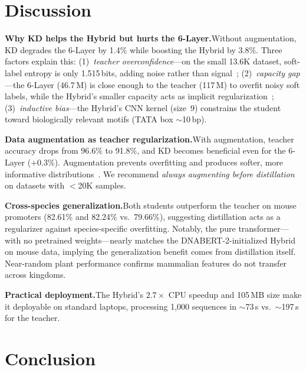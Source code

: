 \documentclass{article}
\begin{document}
\section{Discussion}
\label{sec:discussion}

\textbf{Why KD helps the Hybrid but hurts the 6-Layer.}\quad Without augmentation, KD degrades the 6-Layer by 1.4\% while boosting the Hybrid by 3.8\%. Three factors explain this: (1)~\emph{teacher overconfidence}---on the small 13.6K dataset, soft-label entropy is only 1.515\,bits, adding noise rather than signal~\cite{hinton2015distilling, li2023curriculum}; (2)~\emph{capacity gap}---the 6-Layer (46.7\,M) is close enough to the teacher (117\,M) to overfit noisy soft labels, while the Hybrid's smaller capacity acts as implicit regularization~\cite{mirzadeh2020improved}; (3)~\emph{inductive bias}---the Hybrid's CNN kernel (size~9) constrains the student toward biologically relevant motifs (TATA box $\sim$10\,bp).

\textbf{Data augmentation as teacher regularization.}\quad With augmentation, teacher accuracy drops from 96.6\% to 91.8\%, and KD becomes beneficial even for the 6-Layer ($+0.3\%$). Augmentation prevents overfitting and produces softer, more informative distributions~\cite{tang2020understanding}. We recommend \emph{always augmenting before distillation} on datasets with $<$20K samples.

\textbf{Cross-species generalization.}\quad Both students outperform the teacher on mouse promoters (82.61\% and 82.24\% vs.\ 79.66\%), suggesting distillation acts as a regularizer against species-specific overfitting. Notably, the pure transformer---with no pretrained weights---nearly matches the DNABERT-2-initialized Hybrid on mouse data, implying the generalization benefit comes from distillation itself. Near-random plant performance confirms mammalian features do not transfer across kingdoms.

\textbf{Practical deployment.}\quad The Hybrid's $2.7\times$ CPU speedup and 105\,MB size make it deployable on standard laptops, processing 1,000 sequences in $\sim$73\,s vs.\ $\sim$197\,s for the teacher.

\section{Conclusion}
\label{sec:conclusion}
\end{document}

